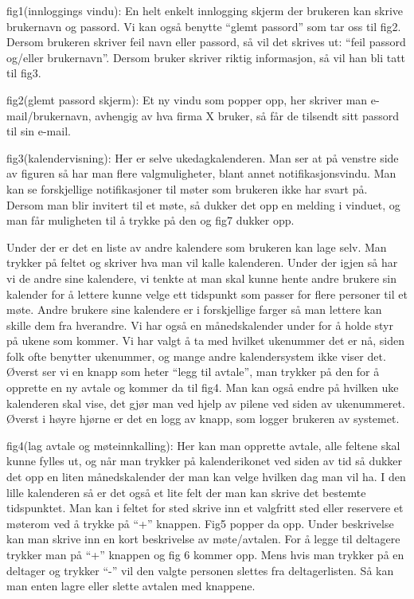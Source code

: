 fig1(innloggings vindu):
En helt enkelt innlogging skjerm der brukeren kan skrive brukernavn og passord. Vi kan også benytte “glemt passord” som tar oss til fig2. Dersom brukeren skriver feil navn eller passord, så vil det skrives ut: “feil passord og/eller brukernavn”. Dersom bruker skriver riktig informasjon, så vil han bli tatt til fig3.

fig2(glemt passord skjerm):
Et ny vindu som popper opp, her skriver man e-mail/brukernavn, avhengig av hva firma X bruker, så får de tilsendt sitt passord til sin e-mail.

fig3(kalendervisning):
Her er selve ukedagkalenderen. Man ser at på venstre side av figuren så har man flere valgmuligheter, blant annet notifikasjonsvindu. Man kan se forskjellige notifikasjoner til møter som brukeren ikke har svart på. Dersom man blir invitert til et møte, så dukker det opp en melding i vinduet, og man får muligheten til å trykke på den og fig7 dukker opp. 

Under der er det en liste av andre kalendere som brukeren kan lage selv. Man trykker på feltet og skriver hva man vil kalle kalenderen. Under der igjen så har vi de andre sine kalendere, vi tenkte at man skal kunne hente andre brukere sin kalender for å lettere kunne velge ett tidspunkt som passer for flere personer til et møte. Andre brukere sine kalendere er i forskjellige farger så man lettere kan skille dem fra hverandre. Vi har også en månedskalender under for å holde styr på ukene som kommer. Vi har valgt å ta med hvilket ukenummer det er nå, siden folk ofte benytter ukenummer, og mange andre kalendersystem ikke viser det. Øverst ser vi en knapp som heter “legg til avtale”, man trykker på den for å opprette en ny avtale og kommer da til fig4. Man kan også endre på hvilken uke kalenderen skal vise, det gjør man ved hjelp av pilene ved siden av ukenummeret. Øverst i høyre hjørne er det en logg av knapp, som logger brukeren av systemet.


fig4(lag avtale og møteinnkalling):
Her kan man opprette avtale, alle feltene skal kunne fylles ut, og når man trykker på kalenderikonet ved siden av tid så dukker det opp en liten månedskalender der man kan velge hvilken dag man vil ha. I den lille kalenderen så er det også et lite felt der man kan skrive det bestemte tidspunktet. Man kan i feltet for sted skrive inn et valgfritt sted eller reservere et møterom ved å trykke på “+” knappen. Fig5 popper da opp.
Under beskrivelse kan man skrive inn en kort beskrivelse av møte/avtalen. For å legge til deltagere trykker man på  “+” knappen og fig 6 kommer opp. Mens hvis man trykker på en deltager og trykker “-”  vil den valgte personen slettes fra deltagerlisten. Så kan man enten lagre eller slette avtalen med knappene. 

